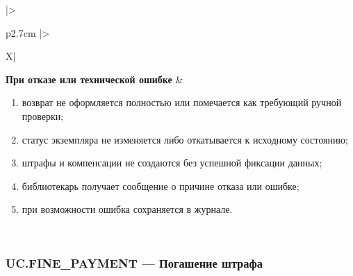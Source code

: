 \documentclass[12pt,a4paper]{article}
\begin{document}
\begin{xltabular}{\textwidth}{
				|>{\raggedright\arraybackslash}p{2.7cm}
				|>{\raggedright\arraybackslash}X|
			}
			\textbf{При отказе или технической ошибке} &
			\begin{enumerate}
				\item возврат не оформляется полностью или помечается как требующий
				ручной проверки;
				\item статус экземпляра не изменяется либо откатывается к исходному
				состоянию;
				\item штрафы и компенсации не создаются без успешной фиксации данных;
				\item библиотекарь получает сообщение о причине отказа или ошибке;
				\item при возможности ошибка сохраняется в журнале.
			\end{enumerate} \\
			\hline
			
		\end{xltabular}
		
		\label{tab:uc-return-specification}
		
		\clearpage
		\subsubsection{UC.FINE\_PAYMENT --- Погашение штрафа}
		
\end{document}
